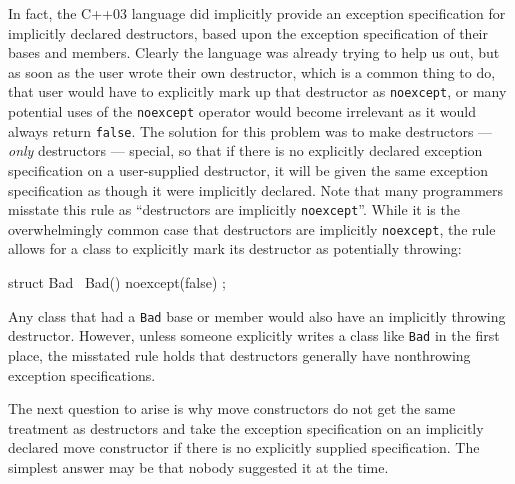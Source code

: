 In fact, the C++03 language did implicitly provide an exception
specification for implicitly declared destructors, based upon the
exception specification of their bases and members. Clearly the language
was already trying to help us out, but as soon as the user wrote their
own destructor, which is a common thing to do, that user would have to
explicitly mark up that destructor as \lstinline!noexcept!, or many
potential uses of the \lstinline!noexcept! operator would become irrelevant
as it would always return \lstinline!false!. The solution for this problem
was to make destructors --- \emph{only} destructors --- special, so that
if there is no explicitly declared exception specification on a
user-supplied destructor, it will be given the same exception
specification as though it were implicitly declared. Note that many
programmers misstate this rule as ``destructors are implicitly
\lstinline!noexcept!''. While it is the overwhelmingly common case that
destructors are implicitly \lstinline!noexcept!, the rule allows for a
class to explicitly mark its destructor as potentially throwing:

\begin{emcppslisting}
struct Bad
{
   ~Bad() noexcept(false) { }
};
\end{emcppslisting}
    

\noindent Any class that had a \lstinline!Bad! base or member would also have an
implicitly throwing destructor. However, unless someone explicitly
writes a class like \lstinline!Bad! in the first place, the misstated rule
holds that destructors generally have nonthrowing exception
specifications.

The next question to arise is why move constructors do not get the same
treatment as destructors and take the exception specification on an
implicitly declared move constructor if there is no explicitly supplied
specification. The simplest answer may be that nobody suggested it at
the time.

